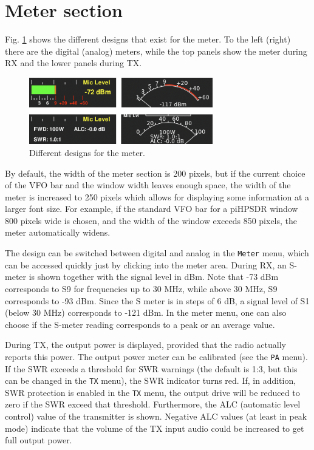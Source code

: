 \documentclass[12pt]{book}
\def\bltt#1{\texttt{\color{blue}#1}}
\def\pH{pi\-HPSDR }
\begin{document}
\section{Meter section}
\label{sec:MeterSection}
Fig. \ref{fig:MeterDesigns} shows the different designs that exist for
the meter. To the left (right) there are the digital (analog) meters,
while the top panels show the meter during RX and the lower panels
during TX.

\begin{figure}[ht]
\center
\includegraphics[width=8cm]{MeterDesigns.png}
\caption{Different designs for the meter.}
\label{fig:MeterDesigns}
\end{figure}

By default, the width of the meter section is 200 pixels, but if the current
choice of the VFO bar and the window width leaves enough space, the width
of the meter is increased to 250 pixels which allows for displaying some information
at a larger font size. For example, if the standard VFO bar for a \pH
window 800 pixels wide is chosen, and the width of the window exceeds 850
pixels, the meter automatically widens.

The design can be switched between digital and analog in the \bltt{Meter}
menu, which can be accessed quickly just by clicking into the meter area.
During RX, an S-meter is shown together with the signal level in dBm. Note
that -73 dBm corresponds to S9 for frequencies up to 30 MHz, while above
30 MHz, S9 corresponds to -93 dBm. Since the S meter is in steps of
6 dB, a signal level of S1 (below 30 MHz) corresponds to -121 dBm. In the
meter menu, one can also choose if the S-meter reading corresponds to a peak
or  an average value.

During TX, the output power is displayed, provided that the radio actually
reports this power. The output power meter can be calibrated (see the \bltt{PA}
menu). If the SWR exceeds a threshold for SWR warnings (the default is 1:3, but
this can be changed in the \bltt{TX} menu), the SWR indicator turns red. If,
in addition, SWR protection is enabled in the \bltt{TX} menu, the output
drive  will be reduced to zero if the SWR exceed that threshold.
Furthermore, the ALC (automatic level control) value of the transmitter is
shown. Negative ALC values (at least in peak mode) indicate that the volume of the TX input audio
could be increased to get full output  power.
\end{document}
